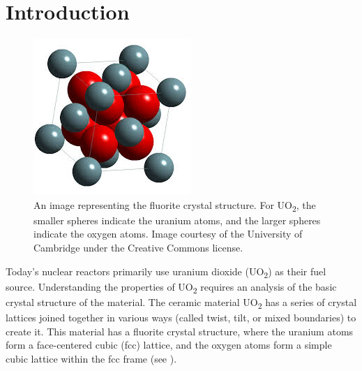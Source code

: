 \documentclass[twoside,senior]{BYUPhys}
\begin{document}
 \frontmatter

 \makepreliminarypages

 \singlespace

 \tableofcontents
 \clearemptydoublepage

 \listoffigures
 \clearemptydoublepage

 \doublespace

 \mainmatter


\chapter{Introduction\label{intro}}
\begin{figure}
\vspace{-20pt}
\centering
\includegraphics[scale=0.7]{Images/UO2}
\vspace{-10pt}
\caption[Example of the fluorite crystal structure.]{\label{fig:uo2Lattice}An image representing the fluorite crystal structure.  For UO\textsubscript{2}, the smaller spheres indicate the uranium atoms, and the larger spheres indicate the oxygen atoms.  Image courtesy of the University of Cambridge under the Creative Commons license.}
\vspace{-10pt}
\end{figure}
Today's nuclear reactors primarily use uranium dioxide (UO\textsubscript{2}) as their fuel source.\cite{uraniumInfo}  Understanding the properties of UO\textsubscript{2} requires an analysis of the basic crystal structure of the material.  The ceramic material UO\textsubscript{2} has a series of crystal lattices joined together in various ways (called twist, tilt, or mixed boundaries) to create it.  This material has a fluorite crystal structure, where the uranium atoms form a face-centered cubic (fcc) lattice, and the oxygen atoms form a simple cubic lattice within the fcc frame (see ).
\end{document}
